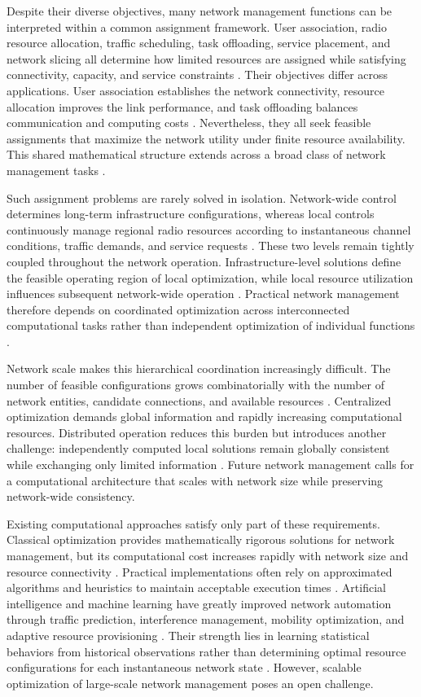 \documentclass[journal]{IEEEtran}
\begin{document}
{Despite their diverse objectives, many network management functions can be interpreted within a common assignment framework. User association, radio resource allocation, traffic scheduling, task offloading, service placement, and network slicing all determine how limited resources are assigned while satisfying connectivity, capacity, and service constraints \cite{5,6}. Their objectives differ across applications. User association establishes the network connectivity, resource allocation improves the link performance, and task offloading balances communication and computing costs \cite{6,7,8}. Nevertheless, they all seek feasible assignments that maximize the network utility under finite resource availability. This shared mathematical structure extends across a broad class of network management tasks \cite{5,6}.

Such assignment problems are rarely solved in isolation. Network-wide control determines long-term infrastructure configurations, whereas local controls continuously manage regional radio resources according to instantaneous channel conditions, traffic demands, and service requests \cite{4,9}. These two levels remain tightly coupled throughout the network operation. Infrastructure-level solutions define the feasible operating region of local optimization, while local resource utilization influences subsequent network-wide operation \cite{5,9}. Practical network management therefore depends on coordinated optimization across interconnected computational tasks rather than independent optimization of individual functions \cite{5,9}.

Network scale makes this hierarchical coordination increasingly difficult. The number of feasible configurations grows combinatorially with the number of network entities, candidate connections, and available resources \cite{5}. Centralized optimization demands global information and rapidly increasing computational resources. Distributed operation reduces this burden but introduces another challenge: independently computed local solutions remain globally consistent while exchanging only limited information \cite{9,10}. Future network management calls for a computational architecture that scales with network size while preserving network-wide consistency.

Existing computational approaches satisfy only part of these requirements. Classical optimization provides mathematically rigorous solutions for network management, but its computational cost increases rapidly with network size and resource connectivity \cite{11,12}. Practical implementations often rely on approximated algorithms and heuristics to maintain acceptable execution times \cite{12,13}. Artificial intelligence and machine learning have greatly improved network automation through traffic prediction, interference management, mobility optimization, and adaptive resource provisioning \cite{2,14}. Their strength lies in learning statistical behaviors from historical observations rather than determining optimal resource configurations for each instantaneous network state \cite{14,15}. However, scalable optimization of large-scale network management poses an open challenge.

}
\end{document}
